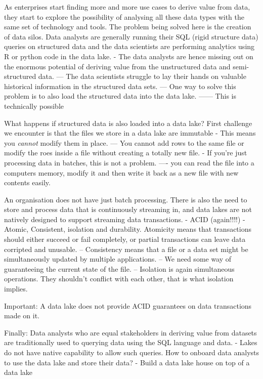 \documentclass[a4paper, 11pt]{article}
\begin{document}
    As enterprises start finding more and more use cases to derive value from data, they start to explore the possibility of analysing all these data types with the same set of technology and tools.
    The problem being solved here is the creation of data silos.
    Data analysts are generally running their SQL (rigid structure data) queries on structured data and the data scientists are performing analytics using R or python code in the data lake.
    - The data analysts are hence missing out on the enormous potential of deriving value from the unstructured data and semi-structured data.
    --- The data scientists struggle to lay their hands on valuable historical information in the structured data sets.
    --- One way to solve this problem is to also load the structured data into the data lake.
    ------ This is technically possible

    What happens if structured data is also loaded into a data lake?
    First challenge we encounter is that the files we store in a data lake are immutable
    - This means you \textit{cannot} modify them in place.
    --- You cannot add rows to the same file or modify the roes inside a file without creating a totally new file.
    - If you're just processing data in batches, this is not a problem.
    ---- you can read the file into a computers memory, modify it and then write it back as a new file with new contents easily.

    An organisation does not have just batch processing.
    There is also the need to store and process data that is continuously streaming in, and data lakes are not natively designed to support streaming data transactions.
    - ACID (again!!!!) - Atomic, Consistent, isolation and durability.
    Atomicity means that transactions should either succeed or fail completely, or partial transactions can leave data corripted and unusable.
    -- Consistency means that a file or a data set might be simultaneously updated by multiple applications.
    -- We need some way of guaranteeing the current state of the file.
    -- Isolation is again simultaneous operations. They shouldn't conflict with each other, that is what isolation implies.

    Important: A data lake does not provide ACID guarantees on data transactions made on it.

    Finally: Data analysts who are equal stakeholders in deriving value from datasets are traditionally used to querying data using the SQL language and data.
    - Lakes do not have native capability to allow such queries.
    How to onboard data analysts to use the data lake and store their data?
    - Build a data lake house on top of a data lake
\end{document}
